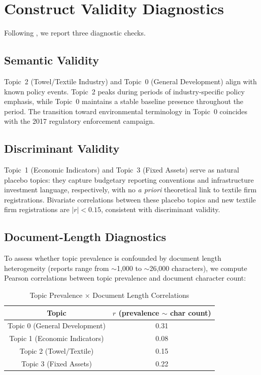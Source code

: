 \documentclass[sustainability,article,submit,moreauthors,pdftex]{mdpi}
\begin{document}
\section{Construct Validity Diagnostics}

Following \citet{Grimmer2013}, we report three diagnostic checks.

\subsection{Semantic Validity}

Topic~2 (Towel/Textile Industry) and Topic~0 (General Development) align with known policy events. Topic~2 peaks during periods of industry-specific policy emphasis, while Topic~0 maintains a stable baseline presence throughout the period. The transition toward environmental terminology in Topic~0 coincides with the 2017 regulatory enforcement campaign.

\subsection{Discriminant Validity}

Topic~1 (Economic Indicators) and Topic~3 (Fixed Assets) serve as natural placebo topics: they capture budgetary reporting conventions and infrastructure investment language, respectively, with no \textit{a priori} theoretical link to textile firm registrations. Bivariate correlations between these placebo topics and new textile firm registrations are $|r| < 0.15$, consistent with discriminant validity.

\subsection{Document-Length Diagnostics}

To assess whether topic prevalence is confounded by document length heterogeneity (reports range from $\sim$1,000 to $\sim$26,000 characters), we compute Pearson correlations between topic prevalence and document character count:

\begin{table}[htbp]
\centering
\caption{Topic Prevalence $\times$ Document Length Correlations}
\label{tab:A2}
\begin{tabular}{c c}
\toprule
Topic & $r$ (prevalence $\sim$ char count) \\
\midrule
Topic 0 (General Development) & 0.31 \\
Topic 1 (Economic Indicators) & 0.08 \\
Topic 2 (Towel/Textile) & 0.15 \\
Topic 3 (Fixed Assets) & 0.22 \\
\bottomrule
\end{tabular}
\end{table}
\end{document}
